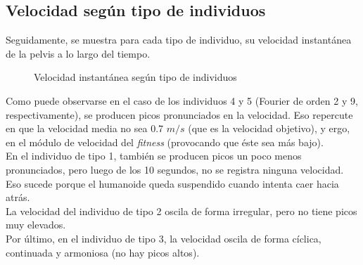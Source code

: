 \documentclass{article}
\begin{document}
\subsection{Velocidad seg\'un tipo de individuos}
Seguidamente, se muestra para cada tipo de individuo, su velocidad instant\'anea de la pelvis a lo largo del tiempo.
\begin{figure}[H]%
  \centering
  \caption{Velocidad instant\'anea seg\'un tipo de individuos}%
  \label{fig:resultados_velocidad} %
\end{figure}
\noindent Como puede observarse en el caso de los individuos 4 y 5 (Fourier de orden 2 y 9, respectivamente), se producen picos pronunciados en la velocidad. Eso repercute en que la velocidad media no sea 0.7 $m/s$ (que es la velocidad objetivo), y ergo, en el m\'odulo de velocidad del \textit{fitness} (provocando que \'este sea m\'as bajo).\\
En el individuo de tipo 1, tambi\'en se producen picos un poco menos pronunciados, pero luego de los 10 segundos, no se registra ninguna velocidad. Eso sucede porque el humanoide queda suspendido cuando intenta caer hacia atr\'as.\\
La velocidad del individuo de tipo 2 oscila de forma irregular, pero no tiene picos muy elevados.\\ 
Por \'ultimo, en el individuo de tipo 3, la velocidad oscila de forma c\'iclica, continuada y armoniosa (no hay picos altos).
\end{document}
